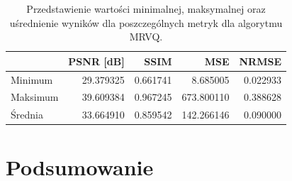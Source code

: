 \documentclass{article}
\begin{document}
\begin{table}[H]
\centering
\begin{tabular}{@{}lrrrr@{}}
\toprule
         & PSNR {[}dB{]} & SSIM  & MSE     & NRMSE \\ \midrule
Minimum  &  29.379325 &  0.661741 &    8.685005 &  0.022933 \\
Maksimum &  39.609384 &  0.967245 &  673.800110 &  0.388628 \\
Średnia  &  33.664910 &  0.859542 &  142.266146 &  0.090000 \\
\bottomrule
\end{tabular}
\caption{Przedstawienie wartości minimalnej, maksymalnej oraz uśrednienie wyników dla poszczególnych metryk dla algorytmu MRVQ.}
\label{tab:mrvq_summary}
\end{table}


\FloatBarrier
\section{Podsumowanie}

\lipsum[1-3]

  
\end{document}
